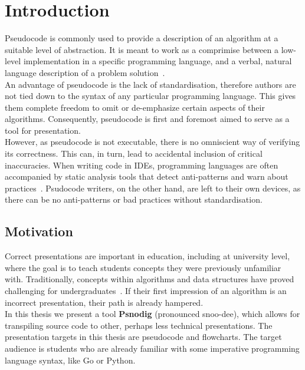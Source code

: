 \chapter{Introduction}

Pseudocode is commonly used to provide a description of an algorithm at a suitable level of abstraction. It is meant to work as a comprimise between a low-level implementation in a specific programming language, and a verbal, natural language description of a problem solution~\cite{LinfoAlgorithmsIntro2007}. \hfill \\

An advantage of pseudocode is the lack of standardisation, therefore authors are not tied down to the syntax of any particular programming language. This gives them complete freedom to omit or de-emphasize certain aspects of their algorithms. Consequently, pseudocode is first and foremost aimed to serve as a tool for presentation. \hfill \\

However, as pseudocode is not executable, there is no omniscient way of verifying its correctness. This can, in turn, lead to accidental inclusion of critical inaccuracies. %
When writing code in IDEs, programming languages are often accompanied by static analysis tools that detect anti-patterns and warn about practices~\cite{linter}. Psudocode writers, on the other hand, are left to their own devices, as there can be no anti-patterns or bad practices without standardisation.

\section{Motivation}

Correct presentations are important in education, including at university level, where the goal is to teach students concepts they were previously unfamiliar with. Traditionally, concepts within algorithms and data structures have proved challenging for undergraduates~\cite{10.1145/2157136.2157148}. If their first impression of an algorithm is an incorrect presentation, their path is already hampered. \hfill \\ %

In this thesis we present a tool \textbf{Psnodig} (pronounced snoo-dee), which allows for transpiling source code to other, perhaps less technical presentations. The presentation targets in this thesis are pseudocode and flowcharts. The target audience is students who are already familiar with some imperative programming language syntax, like Go or Python. \hfill \\

